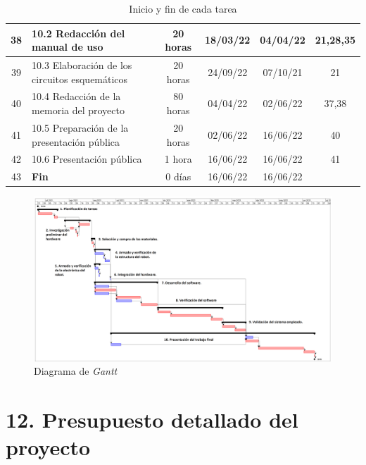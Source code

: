 \documentclass[
11pt, %
codirector, %
]{charter}
\begin{document}
\begin{table}[htbp]
{\begin{tabular}{|c|p{25em}|c|c|c|c|}
\hline 38 & 10.2 Redacción del manual de uso & 20 horas & 18/03/22 & 04/04/22 & 21,28,35 \\
\hline 39 & 10.3 Elaboración de los circuitos esquemáticos & 20 horas & 24/09/22 & 07/10/21 & 21 \\
\hline 40 & 10.4 Redacción de la memoria del proyecto & 80 horas & 04/04/22 & 02/06/22 & 37,38 \\
\hline 41 & 10.5 Preparación de la presentación pública & 20 horas & 02/06/22 & 16/06/22 & 40 \\
\hline 42 & 10.6 Presentación pública & 1 hora & 16/06/22 & 16/06/22 & 41 \\
\hline 43 & \textbf{Fin} & 0 días & 16/06/22 & 16/06/22 &  \\
\hline
\end{tabular}}
\caption{Inicio y fin de cada tarea}
\label{tab:CuadroGantt}
\end{table}

\newpage
\begin{landscape}
\begin{figure}[htpb]
\includegraphics[width=1.6\textwidth]{./Figuras/gantt_tetrapodo_new.png}
\caption{Diagrama de \textit{Gantt}}
\label{fig:Gantt}
\end{figure}
\end{landscape}

\section{12. Presupuesto detallado del proyecto}
\label{sec:presupuesto}
\end{document}
